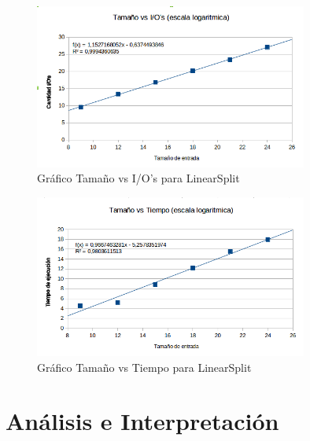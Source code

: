 \documentclass[letterpaper,12pt]{article}
\begin{document}
\begin{figure}
  \centering
    \includegraphics[width=0.8\textwidth]{linear_io}
  \caption{Gr\'afico Tama\~no vs I/O's para LinearSplit}
  \label{fig:f3}
\end{figure}

\begin{figure}
  \centering
    \includegraphics[width=0.8\textwidth]{linear_tiempo}
  \caption{Gr\'afico Tama\~no vs Tiempo para LinearSplit}
  \label{fig:f4}
\end{figure}

\newpage
\section{An\'alisis e Interpretaci\'on}
 
 
 
 
 
 
\end{document}
